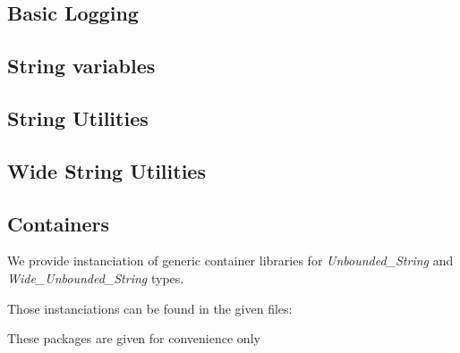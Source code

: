 \documentclass[english,letterpaper]{book}
\begin{document}
\subsection{Basic Logging}
\label{api:log}

\subsection{String variables}
\label{api:replacer}

\subsection{String Utilities}
\label{api:string_util}

\subsection{Wide String Utilities}
\label{api:wide_string_util}

\subsection{Containers}
\label{api:containers}

We provide instanciation of generic container libraries for \emph{Unbounded\_String} and \emph{Wide\_Unbounded\_String} types.

Those instanciations can be found in the given files:












These packages are given for convenience only
\end{document}
